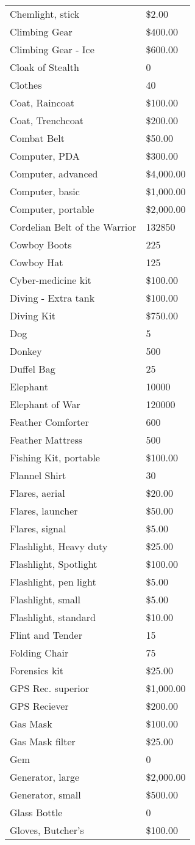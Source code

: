 \documentclass[twoside]{book}
\begin{document}
\begin{longtable}{p{1.25in}l}
      \raggedright Chemlight, stick&\$2.00\tabularnewline
      \raggedright Climbing Gear&\$400.00\tabularnewline
      \raggedright Climbing Gear - Ice&\$600.00\tabularnewline
      \raggedright Cloak of Stealth&0\tabularnewline
      \raggedright Clothes&40\tabularnewline
      \raggedright Coat, Raincoat&\$100.00\tabularnewline
      \raggedright Coat, Trenchcoat&\$200.00\tabularnewline
      \raggedright Combat Belt&\$50.00\tabularnewline
      \raggedright Computer, PDA&\$300.00\tabularnewline
      \raggedright Computer, advanced&\$4,000.00\tabularnewline
      \raggedright Computer, basic&\$1,000.00\tabularnewline
      \raggedright Computer, portable&\$2,000.00\tabularnewline
      \raggedright Cordelian Belt of the Warrior&132850\tabularnewline
      \raggedright Cowboy Boots&225\tabularnewline
      \raggedright Cowboy Hat&125\tabularnewline
      \raggedright Cyber-medicine kit&\$100.00\tabularnewline
      \raggedright Diving - Extra tank&\$100.00\tabularnewline
      \raggedright Diving Kit&\$750.00\tabularnewline
      \raggedright Dog&5\tabularnewline
      \raggedright Donkey&500\tabularnewline
      \raggedright Duffel Bag&25\tabularnewline
      \raggedright Elephant&10000\tabularnewline
      \raggedright Elephant of War&120000\tabularnewline
      \raggedright Feather Comforter&600\tabularnewline
      \raggedright Feather Mattress&500\tabularnewline
      \raggedright Fishing Kit, portable&\$100.00\tabularnewline
      \raggedright Flannel Shirt&30\tabularnewline
      \raggedright Flares, aerial&\$20.00\tabularnewline
      \raggedright Flares, launcher&\$50.00\tabularnewline
      \raggedright Flares, signal&\$5.00\tabularnewline
      \raggedright Flashlight, Heavy duty&\$25.00\tabularnewline
      \raggedright Flashlight, Spotlight&\$100.00\tabularnewline
      \raggedright Flashlight, pen light&\$5.00\tabularnewline
      \raggedright Flashlight, small&\$5.00\tabularnewline
      \raggedright Flashlight, standard&\$10.00\tabularnewline
      \raggedright Flint and Tender&15\tabularnewline
      \raggedright Folding Chair&75\tabularnewline
      \raggedright Forensics kit&\$25.00\tabularnewline
      \raggedright GPS Rec. superior&\$1,000.00\tabularnewline
      \raggedright GPS Reciever&\$200.00\tabularnewline
      \raggedright Gas Mask&\$100.00\tabularnewline
      \raggedright Gas Mask filter&\$25.00\tabularnewline
      \raggedright Gem&0\tabularnewline
      \raggedright Generator, large&\$2,000.00\tabularnewline
      \raggedright Generator, small&\$500.00\tabularnewline
      \raggedright Glass Bottle&0\tabularnewline
      \raggedright Gloves, Butcher's&\$100.00\tabularnewline

\end{longtable}
\end{document}
